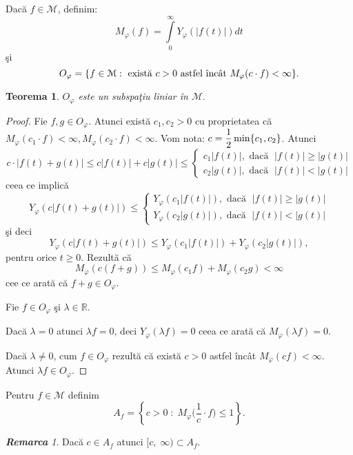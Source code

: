 \documentclass[ a4paper, 12pt]{report}
\newtheorem{theorem}{\bf Teorema}[section]
\theoremstyle{definition}
\theoremstyle{remark}
\newtheorem{remarc}{\bf Remarca}[section]
\numberwithin{equation}{section}
\begin{document}
Dac\u a $f \in \mathcal{M}$, definim:
$$M_\varphi (f) = \int\limits_{0}^{\infty} Y_\varphi (\lvert f(t) \rvert)dt$$ \c si
$$O_\varphi = \{f \in \mathcal{M} : \hbox{ exist\u a } c>0 \hbox{ astfel \^\i nc\^ at } M_\varphi (c \cdot f) < \infty\}.$$

\begin{theorem}
$O_\varphi$ este un subspa\c tiu liniar \^in $\mathcal{M}.$
\end{theorem}

\begin{proof}
Fie $f,g \in O_\varphi$. Atunci exist\u a $ c_1,c_2>0$ cu proprietatea c\u a $M_\varphi(c_1 \cdot f)<\infty, M_\varphi(c_2 \cdot f)<\infty.$
Vom nota: $c = \displaystyle\frac{1}{2}\min\{c_1,c_2\}$. Atunci
$$c \cdot \lvert f(t)+g(t) \rvert \leq c\lvert f(t)\rvert + c\lvert g(t) \rvert\leq \begin{cases}
c_1 \lvert f(t) \rvert, \text{ dac\u a } \;\lvert f(t) \rvert \geq \lvert g(t) \rvert \\
c_2 \lvert g(t) \rvert, \text{ dac\u a } \;\lvert f(t) \rvert<\lvert g(t) \rvert
\end{cases}$$
ceea ce implic\u a
$$Y_\varphi (c\lvert f(t)+g(t) \rvert) \leq \begin{cases}
Y_\varphi (c_1 \lvert f(t) \rvert), \text{ dac\u a } \; \lvert f(t)\rvert \geq \lvert g(t) \rvert\\
Y_\varphi (c_2 \lvert g(t) \rvert), \text{ dac\u a } \; \lvert f(t)\rvert < \lvert g(t) \rvert
\end{cases}$$
\c si deci
$$Y_\varphi (c \lvert f(t)+g(t) \rvert)\leq Y_\varphi(c_1 \lvert f(t)\rvert)+ Y_\varphi(c_2 \lvert g(t)\rvert),$$ pentru orice $t \geq 0$. Rezult\u a c\u a
 $$ M_\varphi (c (f+g)) \leq M_\varphi(c_1 f) + M_\varphi(c_2 g) < \infty$$ cee ce arat\u a c\u a $f+g \in O_\varphi$.

Fie $f \in O_\varphi$ \c si $\lambda \in \mathbb{R}$.

Dac\u a $\lambda = 0$ atunci $\lambda f = 0$, deci $Y_\varphi(\lambda f) = 0$ ceea ce arat\u a c\u a $M_\varphi (\lambda f) = 0.$

Dac\u a $\lambda \neq 0$, cum $f \in O_\varphi$ rezult\u a c\u a exist\u a $c >0 $ astfel \^inc\^at $M_\varphi (cf)< \infty$. Atunci $\lambda f \in O_\varphi$.
\end{proof}

Pentru $f \in \mathcal{M}$ definim
$$A_f = \left\{ c>0 \; : \; M_\varphi \Big( \frac{1}{c} \cdot f\Big) \leq 1\right\}.$$

\begin{remarc}
Dac\u a $c \in A_f$ atunci $[c,\; \infty) \subset A_f$.
\end{remarc}
\end{document}
